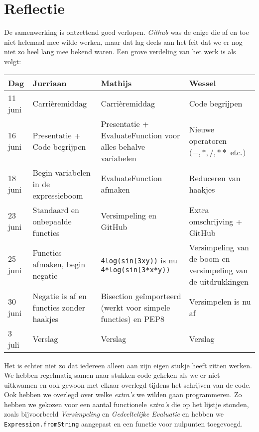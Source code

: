 \documentclass[12pt]{article}
\begin{document}
\section{Reflectie}
De samenwerking is ontzettend goed verlopen. \textit{Github} was de enige die af en toe niet helemaal mee wilde werken, maar dat lag deels aan het feit dat we er nog niet zo heel lang mee bekend waren. Een grove verdeling van het werk is als volgt:

\begin{center}
    \begin{tabular}{ | l | p{4cm}  | p{4cm} | p{4cm} |}
    \hline
    Dag & Jurriaan & Mathijs & Wessel \\ \hline
    11 juni & Carri\`eremiddag & Carri\`eremiddag & Code begrijpen \\ \hline
    16 juni & Presentatie + Code begrijpen & Presentatie + EvaluateFunction voor alles behalve variabelen & Nieuwe operatoren  $(-, *, /, **$ etc.$)$ \\ \hline
    18 juni & Begin variabelen in de expressieboom & EvaluateFunction afmaken & Reduceren van haakjes \\ \hline
    23 juni & Standaard en onbepaalde functies & Versimpeling en GitHub & Extra omschrijving + GitHub \\ \hline
    25 juni & Functies afmaken, begin negatie & \texttt{4log(sin(3xy))} is nu \texttt{4*log(sin(3*x*y))} & Versimpeling van de boom en versimpeling van de uitdrukkingen \\ \hline
    30 juni & Negatie is af en functies zonder haakjes & Bisection ge\"{i}mporteerd (werkt voor simpele functies) en PEP8 & Versimpelen is nu af \\ \hline
    3 juli & Verslag & Verslag & Verslag \\
    \hline
    \end{tabular}
\end{center}
Het is echter niet zo dat iedereen alleen aan zijn eigen stukje heeft zitten werken. We hebben regelmatig samen naar stukken code gekeken als we er niet uitkwamen en ook gewoon met elkaar overlegd tijdens het schrijven van de code. Ook hebben we overlegd over welke \textit{extra's} we wilden gaan programmeren. Zo hebben we gekozen voor een aantal functionele \textit{extra's} die op het lijstje stonden, zoals bijvoorbeeld \textit{Versimpeling} en \textit{Gedeeltelijke Evaluatie} en hebben we \texttt{Expression.fromString} aangepast en een functie voor nulpunten toegevoegd. \\ \newline
\end{document}

